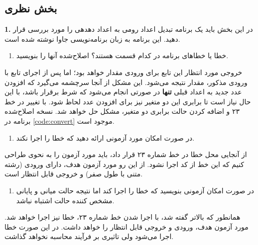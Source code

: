 \documentclass{article}
\newenvironment{answer}{}{\\[.3ex]}
\newenvironment{question}[1]{\textbf{#1.} }{}
\newenvironment{qitem}[1]{%
	\begin{enumerate}\item[(#1)]}{\end{enumerate}}
\begin{document}
\subsection*{بخش نظری}
\begin{question}{1}
در این بخش باید یک برنامه تبدیل اعداد رومی به اعداد دهدهی را مورد بررسی قرار دهید. این برنامه به زبان برنامه‌نویسی جاوا نوشته شده است.
\end{question}
\begin{qitem}{a}
خطا یا خطاهای برنامه در کدام قسمت هستند؟ اصلاح‌شده آنها را بنویسید.
\end{qitem}
\begin{answer}
خروجی مورد انتظار این تابع برای ورودی  مقدار  خواهد بود؛ اما پس از اجرای تابع با ورودی مذکور، مقدار  نتیجه می‌شود. این مشکل از آنجا سرچشمه می‌گیرد که افزودن عدد جدید به اعداد قبلی \textbf{تنها} در صورتی انجام می‌شود که شرط  برقرار باشد، با این حال نیاز است تا برابری این دو متغیر نیز برای افزودن عدد لحاظ شود. با تغییر در خط ۲۳ و اضافه کردن حالت برابری دو متغیر، مشکل حل خواهد شد. نسخه اصلاح‌شده برنامه در \autoref{code:convert} موجود است.
\end{answer}
\begin{qitem}{b}
در صورت امکان مورد آزمونی ارائه دهید که خطا را اجرا نکند.
\end{qitem}
\begin{answer}
از آنجایی محل خطا در خط شماره ۲۳ قرار داد، باید مورد آزمون را به نحوی طراحی کنیم که این خط از کد اجرا نشود. از این رو مورد آزمون هدف، دارای ورودی  (رشته متنی با طول صفر) و خروجی قابل انتظار  است.
\end{answer}
\begin{qitem}{c}
در صورت امکان آزمونی بنویسید که خطا را اجرا کند اما نتیجه حالت میانی و پایانی مشخص کننده حالت اشتباه نباشد.
\end{qitem}
\begin{answer}
همانطور که بالاتر گفته شد، با اجرا شدن خط شماره ۲۳، خطا نیز اجرا خواهد شد. مورد آزمون هدف، ورودی  و خروجی قابل انتظار  را خواهد داشت. در این صورت خطا اجرا می‌شود ولی تاثیری بر فرآیند محاسبه نخواهد گذاشت.
\end{answer}
\end{document}
